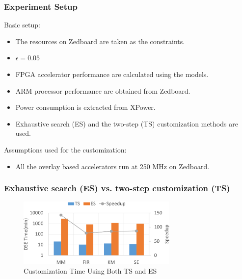 \documentclass[accentcolor=tud1a,colorbacktitle,inverttitle,landscape,german,presentation,t]{tudbeamer}
\begin{document}
  \begin{frame}
  \frametitle{Experiment Setup}
  Basic setup:
  \begin{itemize}
    \item The resources on Zedboard are taken as the constraints.
    \item $\epsilon = 0.05$ 
    \item FPGA accelerator performance are calculated using the models. 
    \item ARM processor performance are obtained from Zedboard.
    \item Power consumption is extracted from XPower. 
    \item Exhaustive search (ES) and the two-step (TS) customization methods are used.
  \end{itemize}
  \vspace{1em}
  Assumptions used for the customization:
  \begin{itemize}
  \item All the overlay based accelerators run at 250 MHz on Zedboard.
  \end{itemize}
  \end{frame}

  \begin{frame}
  \frametitle{Exhaustive search (ES) vs. two-step customization (TS)}
  \vspace{1em}
  \begin{figure}[htb]
    \centering
    \includegraphics[width=0.7\textwidth]{DSE-Time}
    \caption{Customization Time Using Both TS and ES}
    \label{fig:DSE-Time}
  \end{figure}
  \end{frame}
\end{document}
